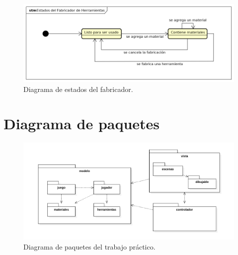 \documentclass[titlepage,a4paper]{article}
\begin{document}
\begin{figure}[H]
	\centering
	\includegraphics[width=\textwidth]{Diagramas/EstadosFabricador.png}
	\caption{\label{fig:estadosfabricador}Diagrama de estados del fabricador.}
\end{figure}

\section{Diagrama de paquetes}\label{sec:diagramadepaquetes}
\begin{figure}[H]
	\centering
	\includegraphics[width=\textwidth]{Diagramas/Paquetes.png}
	\caption{\label{fig:paquetes}Diagrama de paquetes del trabajo práctico.}
\end{figure}
\end{document}
